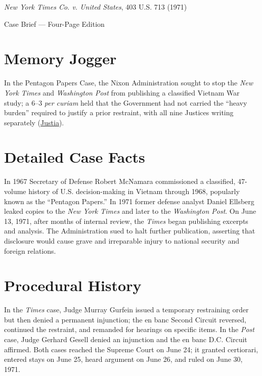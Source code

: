 \documentclass[12pt]{article}
\begin{document}
\begin{center}
{\LARGE \textit{New York Times Co. v. United States}, 403 U.S. 713 (1971)\par}
\vspace{0.8em}
{\large Case Brief --- Four-Page Edition\par}
\end{center}
\vspace{1em}

\section{Memory Jogger}

In the Pentagon Papers Case, the Nixon Administration sought to stop the \textit{New York Times} and \textit{Washington Post} from publishing a classified Vietnam War study; a 6--3 \textit{per curiam} held that the Government had not carried the ``heavy burden'' required to justify a prior restraint, with all nine Justices writing separately (\href{https://supreme.justia.com/cases/federal/us/403/713/}{Justia}).

\section{Detailed Case Facts}

In 1967 Secretary of Defense Robert McNamara commissioned a classified, 47-volume history of U.S. decision-making in Vietnam through 1968, popularly known as the ``Pentagon Papers.'' In 1971 former defense analyst Daniel Ellsberg leaked copies to the \textit{New York Times} and later to the \textit{Washington Post}. On June 13, 1971, after months of internal review, the \textit{Times} began publishing excerpts and analysis. The Administration sued to halt further publication, asserting that disclosure would cause grave and irreparable injury to national security and foreign relations.

\section{Procedural History}

In the \textit{Times} case, Judge Murray Gurfein issued a temporary restraining order but then denied a permanent injunction; the en banc Second Circuit reversed, continued the restraint, and remanded for hearings on specific items. In the \textit{Post} case, Judge Gerhard Gesell denied an injunction and the en banc D.C. Circuit affirmed. Both cases reached the Supreme Court on June 24; it granted certiorari, entered stays on June 25, heard argument on June 26, and ruled on June 30, 1971.
\end{document}
